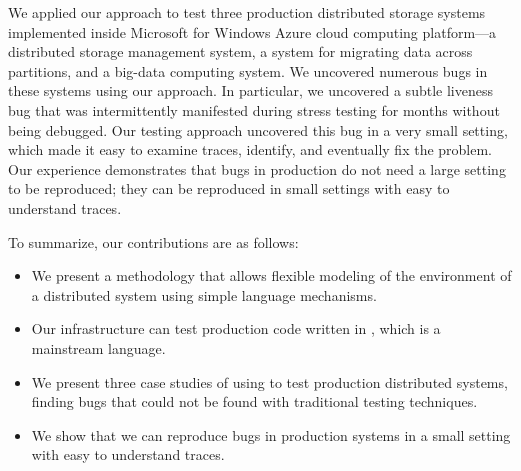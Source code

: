 We applied our approach to test three production distributed storage systems implemented inside Microsoft for Windows Azure cloud computing
platform---a distributed storage management system, a system for migrating data across partitions, and a big-data computing system.
We uncovered numerous bugs in these systems using our approach.
In particular, we uncovered a subtle liveness bug that was intermittently manifested during stress testing for months without being debugged.
Our testing approach uncovered this bug in a very small setting, which made it easy to examine traces, identify, and eventually fix the problem.
Our experience demonstrates that bugs in production do not need a large setting to be reproduced;
they can be reproduced in small settings with easy to understand traces.

To summarize, our contributions are as follows:
\begin{itemize}
\item We present a methodology that allows flexible modeling of the environment of a distributed system using simple language mechanisms.
\item Our infrastructure can test production code written in \csharp, which is a mainstream language.
\item We present three case studies of using \psharp to test production distributed systems, finding bugs that could not be found with traditional testing techniques.
\item We show that we can reproduce bugs in production systems in a small setting with easy to understand traces.
\end{itemize}

